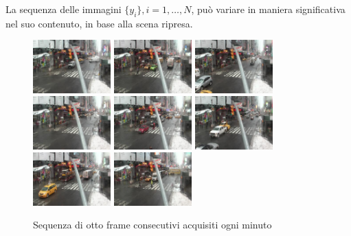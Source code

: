 La sequenza delle immagini $\{y_i\}, i = 1,\dots , N$, pu\`o variare in maniera significativa nel suo contenuto, in base alla scena ripresa.
\begin{figure}
	\centering
	\includegraphics[width=3cm]{./pictures/image0001.eps}
	\includegraphics[width=3cm]{./pictures/image0002.eps}
	\includegraphics[width=3cm]{./pictures/image0003.eps}
	\includegraphics[width=3cm]{./pictures/image0004.eps}
	\includegraphics[width=3cm]{./pictures/image0005.eps}
	\includegraphics[width=3cm]{./pictures/image0006.eps}
	\includegraphics[width=3cm]{./pictures/image0007.eps}
	\includegraphics[width=3cm]{./pictures/image0008.eps}
	\caption{Sequenza di otto frame consecutivi acquisiti ogni minuto}
	\label{fig:framDifferences}
\end{figure}
